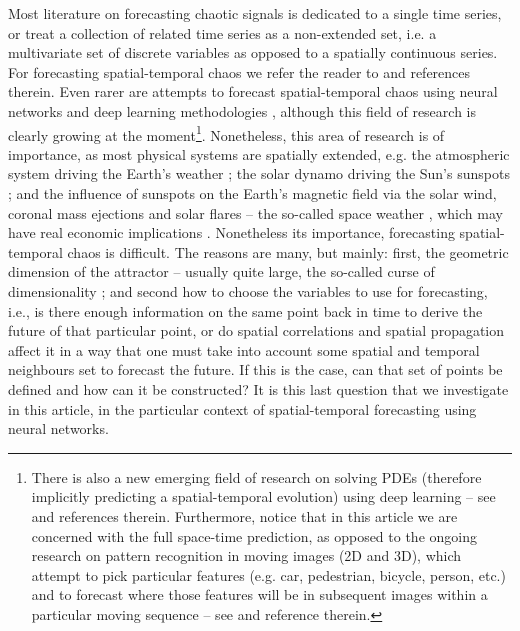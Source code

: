 \documentclass[journal]{IEEEtran}
\begin{document}
Most literature on forecasting chaotic signals is dedicated to a single time series, or treat a collection of related time series as a 
non-extended set, i.e. a multivariate set of discrete variables as opposed to a spatially continuous series. 
For forecasting spatial-temporal chaos we 
refer the reader to 
\cite{doi:10.1063/1.165894,PhysRevE.51.R2709,PhysRevLett.85.2300,ORSTAVIK1998145,
Parlitz2000NonlinearPO,2000PhRvL..84.1890P,Covas,Xia2006APF,ENV:ENV2266,covas2016,ENV:ENV2456} and 
references therein. Even rarer are attempts to forecast spatial-temporal chaos using neural networks and deep learning methodologies 
\cite{covaspeixinhojoao,2017arXiv170805094M,2017arXiv171100636M,2017arXiv171110566R,2017arXiv171110561R,2017arXiv171009668L, 
2017arXiv171205293C, ghaderi2017deepforecast,2017Chaos..27d1102L,
2018JCoPh.357..125R,2018arXiv180106637R}, although this field of research is clearly growing at the moment\footnote{
There is also a new emerging field of research on solving PDEs (therefore implicitly predicting a spatial-temporal
evolution) using deep learning -- see \cite{2017arXiv170905963B,2017arXiv170807469S,2017arXiv170604702E} and references therein.
Furthermore, notice that in this article we are concerned with the full space-time prediction, 
as opposed to the ongoing research on pattern recognition in moving 
images (2D and 3D), which attempt to pick particular features (e.g. car, pedestrian, bicycle, person, etc.) and to forecast where 
those features will be in subsequent images within a particular moving sequence -- see \cite{article_motion} and reference therein.
}.
 Nonetheless, this area of 
research is of importance, as most physical systems are spatially extended, e.g. the atmospheric system driving the Earth's weather
\cite{9780521857291}; the solar dynamo driving the Sun's sunspots \cite{9780198512905}; and the influence of sunspots on the Earth's 
magnetic field via the solar wind, coronal mass ejections and solar flares -- the so-called space weather 
\cite{1851RSPT..141..123S, 1852RSPT..142..103S, 1979P&SS...27.1001S,
1983SoPh...89..195E,1965P&SS...13....9P,2000AdSpR..26...27W,2003A&AT...22..861B,2005GeoRL..3221106S,
2005SpWea...3.8C01K,2006GMS...165..367T,2006GeoRL..3318101H, 2009SunGe...4...55C,2011SpWea...9.6001C,
2013EGUGA..1510865W}, which may have real economic implications \cite{2015SpWea..13..524S}.
Nonetheless its importance, forecasting spatial-temporal chaos is difficult.
The reasons are many, but mainly: first, the geometric dimension of the 
attractor \cite{1985PhLA..107..101G} -- usually quite large, the so-called curse of dimensionality \cite{9780486428093}; 
and second how to choose the variables to use for forecasting, i.e., is there 
enough information on the same point back in time to derive the future of that particular point, or do spatial correlations and spatial 
propagation affect it in a way that one must take into account some spatial and temporal neighbours set to forecast the future.
If this is the case, can that set of points be defined and how can it be constructed? 
It is this last question that we investigate in this article, in the 
particular context of spatial-temporal forecasting using neural networks. 
\end{document}
